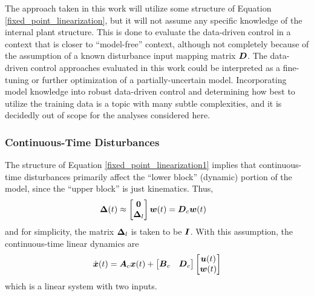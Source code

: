 The approach taken in this work will utilize some structure of Equation \eqref{fixed_point_linearization}, but it will not assume any specific knowledge of the internal plant structure.  This is done to evaluate the data-driven control in a context that is closer to ``model-free'' context, although not completely because of the assumption of a known disturbance input mapping matrix $\vb*{D}$.  The data-driven control approaches evaluated in this work could be interpreted as a fine-tuning or further optimization of a partially-uncertain model.  Incorporating model knowledge into robust data-driven control and determining how best to utilize the training data is a topic with many subtle complexities, and it is decidedly out of scope for the analyses considered here.

\subsubsection{Continuous-Time Disturbances}
The structure of Equation \eqref{fixed_point_linearization1} implies that continuous-time disturbances primarily affect the ``lower block'' (dynamic) portion of the model, since the ``upper block'' is just kinematics.  Thus, 
\begin{equation}
\label{eq-continuous-disturbances}
\begin{aligned}
	 \vb*{\Delta}(t) &\approx
	\begin{bmatrix}
		\vb*{0}\\
		\vb*{\Delta}_{l}\\
	\end{bmatrix} \vb*{w}(t)
	= \vb*{D}_{c} \vb*{w}(t)
\end{aligned}
\end{equation}
and for simplicity, the matrix $\vb*{\Delta}_{l}$ is taken to be $\vb*{I}$.  With this assumption, the continuous-time linear dynamics are
\begin{equation}
\label{fixed_point_linearization}
\begin{aligned}
	\dot{\vb*{x}}(t) &= \vb*{A}_{c}\vb*{x}(t) + \begin{bmatrix} \vb*{B}_{c} & \vb*{D}_{c} \end{bmatrix} \begin{bmatrix} \vb*{u}(t)\\ \vb*{w}(t) \end{bmatrix}\\
\end{aligned}
\end{equation}
which is a linear system with two inputs.


